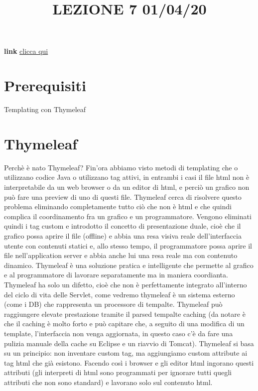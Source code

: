 \title{LEZIONE 7 01/04/20}\newline
\textbf{link} \href{https://web.microsoftstream.com/video/4801f2c5-d151-42aa-9a42-f7400b41b4e7}{clicca qui}
\section*{Prerequisiti}
Templating con Thymeleaf
\section{Thymeleaf}
Perchè è nato Thymeleaf? Fin'ora abbiamo visto metodi di templating che o utilizzano codice Java o utilizzano tag attivi, in entrambi i casi il file html non è interpretabile da un web browser o da un editor di html, e perciò un grafico non può fare una preview di uno di questi file. Thymeleaf cerca di risolvere questo problema eliminando completamente tutto ciò che non è html e che quindi complica il coordinamento fra un grafico e un programmatore.\newline
Vengono eliminati quindi i tag custom e introdotto il concetto di presentazione duale, cioè che il grafico possa aprire il file (offline) e abbia una resa visiva reale dell'interfaccia utente con contenuti statici e, allo stesso tempo, il programmatore possa aprire il file nell'application server e abbia anche lui una resa reale ma con contenuto dinamico.\newline
\newline
Thymeleaf è una soluzione pratica e intelligente che permette al grafico e al programmatore di lavorare separatamente ma in maniera coordianta.\newline
\newline
Thymeleaf ha solo un difetto, cioè che non è perfettamente integrato all'interno del ciclo di vita delle Servlet, come vedremo thymeleaf è un sistema esterno (come i DB) che rappresenta un processore di tempalte.\newline
\newline
Thymeleaf può raggiungere elevate prestazione tramite il parsed tempalte caching (da notare è che il caching è molto forto e può capitare che, a seguito di una modifica di un template, l'interfaccia non venga aggiornata, in questo caso c'è da fare una pulizia manuale della cache su Eclipse e un riavvio di Tomcat).\newline
\newline
Thymeleaf si basa su un principio: non inventare custom tag, ma aggiungiamo custom attribute ai tag html che già esistono. Facendo così i browser e gli editor html ingorano questi attributi (gli interpreti di html sono programmati per ignorare tutti quegli attributi che non sono standard) e lavorano solo sul contenuto html.\newline
